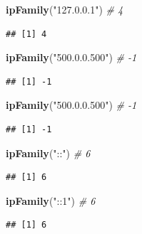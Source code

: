 \documentclass[]{book}
\newenvironment{Shaded}{\begin{snugshade}}{\end{snugshade}}
\newcommand{\KeywordTok}[1]{\textcolor[rgb]{0.13,0.29,0.53}{\textbf{#1}}}
\newcommand{\StringTok}[1]{\textcolor[rgb]{0.31,0.60,0.02}{#1}}
\newcommand{\CommentTok}[1]{\textcolor[rgb]{0.56,0.35,0.01}{\textit{#1}}}
\newcommand{\NormalTok}[1]{#1}
\begin{document}
\begin{Shaded}
\begin{Highlighting}[]
\KeywordTok{ipFamily}\NormalTok{(}\StringTok{"127.0.0.1"}\NormalTok{) }\CommentTok{# 4}
\end{Highlighting}
\end{Shaded}

\begin{verbatim}
## [1] 4
\end{verbatim}

\begin{Shaded}
\begin{Highlighting}[]
\KeywordTok{ipFamily}\NormalTok{(}\StringTok{"500.0.0.500"}\NormalTok{) }\CommentTok{# -1}
\end{Highlighting}
\end{Shaded}

\begin{verbatim}
## [1] -1
\end{verbatim}

\begin{Shaded}
\begin{Highlighting}[]
\KeywordTok{ipFamily}\NormalTok{(}\StringTok{"500.0.0.500"}\NormalTok{) }\CommentTok{# -1}
\end{Highlighting}
\end{Shaded}

\begin{verbatim}
## [1] -1
\end{verbatim}

\begin{Shaded}
\begin{Highlighting}[]
\KeywordTok{ipFamily}\NormalTok{(}\StringTok{"::"}\NormalTok{) }\CommentTok{# 6}
\end{Highlighting}
\end{Shaded}

\begin{verbatim}
## [1] 6
\end{verbatim}

\begin{Shaded}
\begin{Highlighting}[]
\KeywordTok{ipFamily}\NormalTok{(}\StringTok{"::1"}\NormalTok{) }\CommentTok{# 6}
\end{Highlighting}
\end{Shaded}

\begin{verbatim}
## [1] 6
\end{verbatim}
\end{document}
